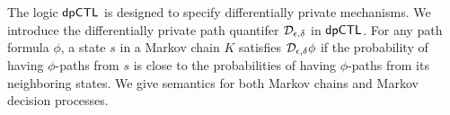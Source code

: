 
The logic $\textsf{dpCTL}$ is designed to specify differentially private
mechanisms. We introduce the differentially private path quantifer
$\mathcal{D}_{{\epsilon}, {\delta}}$ in $\textsf{dpCTL}$. For any path formula
$\phi$, a state $s$ in a Markov chain $K$ satisfies
$\mathcal{D}_{{\epsilon}, {\delta}} \phi$ if the probability of having $\phi$-paths 
from $s$ is close to the probabilities of 
having $\phi$-paths from its neighboring states. 
We give semantics for both Markov chains and Markov decision processes. 

